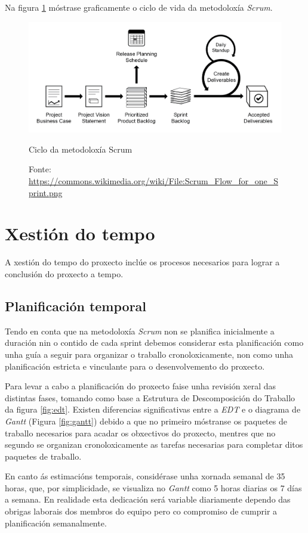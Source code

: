 Na figura \ref{fig:scrum} móstrase graficamente o ciclo de vida da metodoloxía \emph{Scrum}.
\begin{figure}[hbtp]
  \centering
  \includegraphics[width=1.0\textwidth]{images/Scrum.png}
  \caption{Ciclo da metodoloxía Scrum}
  \label{fig:scrum}
  \caption*{Fonte: \url{https://commons.wikimedia.org/wiki/File:Scrum_Flow_for_one_Sprint.png}}
\end{figure}

\section{Xestión do tempo}
A xestión do tempo do proxecto inclúe os procesos necesarios para lograr a conclusión do proxecto a tempo.

\subsection{Planificación temporal}
Tendo en conta que na metodoloxía \emph{Scrum} non se planifica inicialmente a duración nin o contido de cada sprint debemos considerar esta planificación como unha guía a seguir para organizar o traballo cronoloxicamente, non como unha planificación estricta e vinculante para o desenvolvemento do proxecto.

Para levar a cabo a planificación do proxecto faise unha revisión xeral das distintas fases, tomando como base a Estrutura de Descomposición do Traballo da figura \ref{fig:edt}. Existen diferencias significativas entre a \emph{EDT} e o diagrama de \emph{Gantt} (Figura \ref{fig:gantt}) debido a que no primeiro móstranse os paquetes de traballo necesarios para acadar os obxectivos do proxecto, mentres que no segundo se organizan cronoloxicamente as tarefas necesarias para completar ditos paquetes de traballo.

En canto ás estimacións temporais, considérase unha xornada semanal de 35 horas, que, por simplicidade, se visualiza no \emph{Gantt} como 5 horas diarias os 7 días a semana. En realidade esta dedicación será variable diariamente dependo das obrigas laborais dos membros do equipo pero co compromiso de cumprir a planificación semanalmente.

